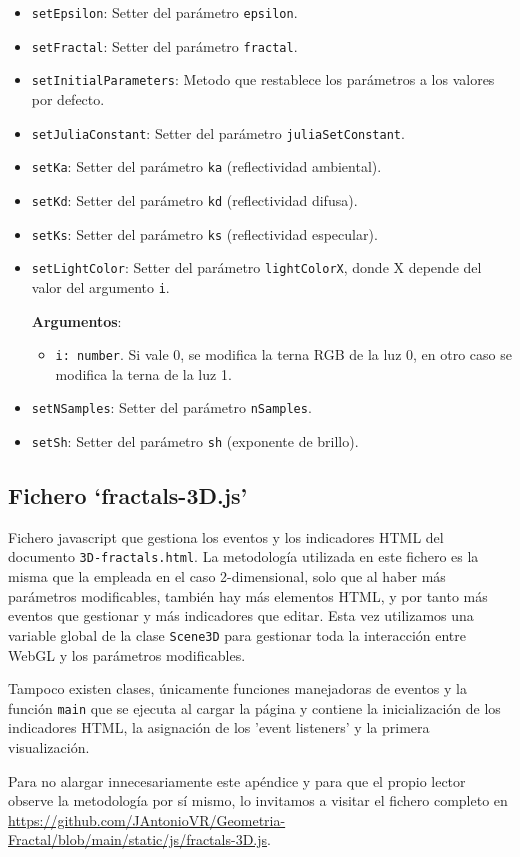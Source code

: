 \begin{itemize}
    \item \verb|setEpsilon|: Setter del parámetro \verb|epsilon|.
    \item \verb|setFractal|: Setter del parámetro \verb|fractal|.
    \item \verb|setInitialParameters|: Metodo que restablece los parámetros a los valores por defecto.
    \item \verb|setJuliaConstant|: Setter del parámetro \verb|juliaSetConstant|.
    \item \verb|setKa|: Setter del parámetro \verb|ka| (reflectividad ambiental).
    \item \verb|setKd|: Setter del parámetro \verb|kd| (reflectividad difusa).
    \item \verb|setKs|: Setter del parámetro \verb|ks| (reflectividad especular).
    \item \verb|setLightColor|: Setter del parámetro \verb|lightColorX|, donde X depende del valor del argumento \verb|i|.
    
    \textbf{Argumentos}:
    \begin{itemize}
        \item \verb|i: number|. Si vale 0, se modifica la terna RGB de la luz 0, en otro caso se modifica la terna de la luz 1.
    \end{itemize}
    \item \verb|setNSamples|: Setter del parámetro \verb|nSamples|.
    
    \item \verb|setSh|: Setter del parámetro \verb|sh| (exponente de brillo).
\end{itemize}

\subsection{Fichero `fractals-3D.js'}

Fichero javascript que gestiona los eventos y los indicadores HTML del documento \verb|3D-fractals.html|. La metodología utilizada en este fichero es la misma que la empleada en el caso 2-dimensional, solo que al haber más parámetros modificables, también hay más elementos HTML, y por tanto más eventos que gestionar y más indicadores que editar. Esta vez utilizamos una variable global de la clase \verb|Scene3D| para gestionar toda la interacción entre WebGL y los parámetros modificables.

Tampoco existen clases, únicamente funciones manejadoras de eventos y la función \verb|main| que se ejecuta al cargar la página y contiene la inicialización de los indicadores HTML, la asignación de los 'event listeners' y la primera visualización.

Para no alargar innecesariamente este apéndice y para que el propio lector observe la metodología por sí mismo, lo invitamos a visitar el fichero completo en \url{https://github.com/JAntonioVR/Geometria-Fractal/blob/main/static/js/fractals-3D.js}.
